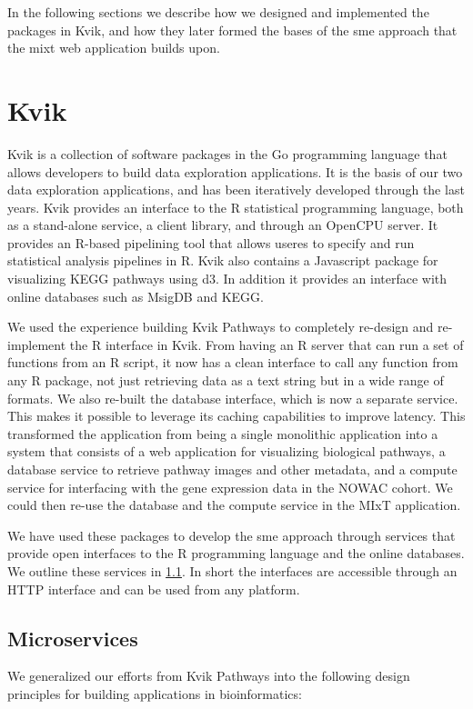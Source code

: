 In the following sections we describe how we designed and implemented the
packages in Kvik, and how they later formed the bases of the \gls{sme} approach
that the \gls{mixt} web application builds upon. 

\section{Kvik}
Kvik is a collection of software packages in the Go programming language that
allows developers to build data exploration applications. It is the basis of our
two data exploration applications, and has been iteratively developed through
the last years. Kvik provides an interface to the R statistical programming
language, both as a stand-alone service, a client library, and through an
OpenCPU server. It provides an R-based pipelining tool that allows useres to
specify and run statistical analysis pipelines in R.  Kvik also contains a
Javascript package for visualizing KEGG pathways using d3.  In addition it
provides an interface with online databases such as MsigDB and KEGG. 

We used the experience building Kvik Pathways to completely re-design and
re-implement the R interface in Kvik. From having an R server that can run a
set of functions from an R script, it now has a clean interface to call any
function from any R package, not just retrieving data as a text string but in a
wide range of formats. We also re-built the database interface, which is now a
separate service. This makes it possible to leverage its caching capabilities
to improve latency. This transformed the application from being a single
monolithic application into a system that consists of a web application for
visualizing biological pathways, a database service to retrieve pathway images
and other metadata, and a compute service for interfacing with the gene
expression data in the NOWAC cohort. We could then re-use the database and the
compute service in the MIxT application. 

We have used these packages to develop the \gls{sme} approach through services
that provide open interfaces to the R programming language and the online
databases.  We outline these services in \ref{micrservices}.  In short the
interfaces are accessible through an HTTP interface and can be used from any
platform.

\subsection{Microservices}\label{micrservices} 
We generalized our efforts from Kvik Pathways into the following design
principles for building applications in bioinformatics: 

